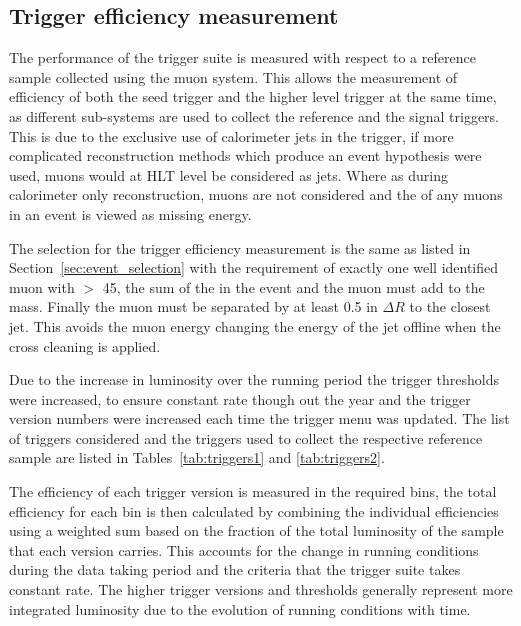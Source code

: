 \subsection{Trigger efficiency measurement} %
\label{sub:trigger_efficiency_measurement}

The performance of the \alt trigger suite is measured with respect to a 
reference sample collected using the muon system. This allows the measurement 
of efficiency of both the \Lone seed trigger and the higher level trigger at 
the same time, as different sub-systems are used to collect the reference and 
the signal triggers. This is due to the exclusive use of calorimeter jets in 
the \alt trigger, if more complicated reconstruction methods which produce an 
event hypothesis were used, muons would at HLT level be considered as 
jets. Where as during calorimeter only reconstruction, muons are not considered 
and the \pt of any muons in an event is viewed as missing energy.

The selection for the trigger efficiency measurement is the same as listed in 
Section~\ref{sec:event_selection} with the requirement of exactly one well 
identified muon with \PT $>$ \unit{45}{\GeV}, the sum of the \MET in the event 
and the muon must add to the \PW mass. Finally the muon must be separated by 
at least 0.5 in $\Delta R$ to the closest jet. This avoids the muon energy 
changing the energy of the jet offline when the cross cleaning is applied.

Due to the increase in luminosity over the running period the trigger 
thresholds were increased, to ensure constant rate though out the year and the 
trigger version numbers were increased each time the trigger menu was updated.
The list of triggers considered and the triggers used to collect the respective 
reference sample are listed in Tables~\ref{tab:triggers1} and 
\ref{tab:triggers2}.

The efficiency of each trigger version is measured in the required \HT bins, 
the total efficiency for each \HT bin is then calculated by combining the 
individual efficiencies using a weighted sum based on the fraction of 
the total luminosity of the sample that each version carries. This accounts for 
the change in running conditions during the data taking period and the criteria 
that the trigger suite takes constant rate. The higher trigger versions and 
thresholds generally represent more integrated luminosity due to the evolution 
of running conditions with time.


